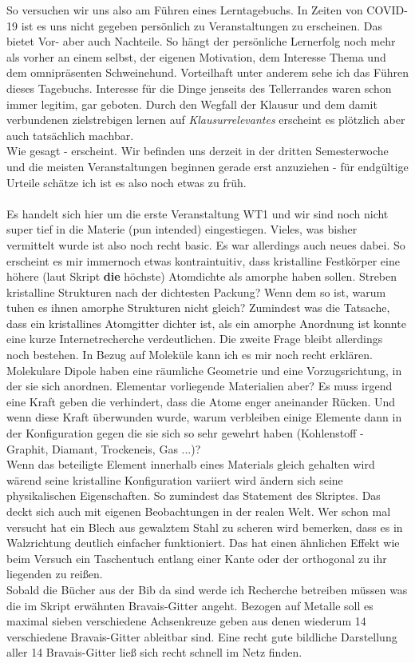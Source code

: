 So versuchen wir uns also am Führen eines Lerntagebuchs. In Zeiten von COVID-19 ist es uns nicht gegeben persönlich zu Veranstaltungen zu erscheinen.
Das bietet Vor- aber auch Nachteile. So hängt der persönliche Lernerfolg noch mehr als vorher an einem selbst, der eigenen Motivation, dem Interesse
Thema und dem omnipräsenten Schweinehund. Vorteilhaft unter anderem sehe ich das Führen dieses Tagebuchs. Interesse für die Dinge jenseits des
Tellerrandes waren schon immer legitim, gar geboten. Durch den Wegfall der Klausur und dem damit verbundenen zielstrebigen lernen auf \textit{Klausurrelevantes}
erscheint es plötzlich aber auch tatsächlich machbar.\\
Wie gesagt - erscheint. Wir befinden uns derzeit in der dritten Semesterwoche und die meisten Veranstaltungen beginnen gerade erst anzuziehen - 
für endgültige Urteile schätze ich ist es also noch etwas zu früh.\\\\
Es handelt sich hier um die erste Veranstaltung WT1 und wir sind noch nicht super tief in die Materie (pun intended) eingestiegen. Vieles, was bisher
vermittelt wurde ist also noch recht basic. Es war allerdings auch neues dabei. So erscheint es mir immernoch etwas kontraintuitiv, dass kristalline Festkörper
eine höhere (laut Skript \textbf{die} höchste) Atomdichte als amorphe haben sollen. Streben kristalline Strukturen nach der dichtesten Packung?
Wenn dem so ist, warum tuhen es ihnen amorphe Strukturen nicht gleich? Zumindest was die Tatsache, dass ein kristallines Atomgitter dichter ist, als ein amorphe
Anordnung ist konnte eine kurze Internetrecherche verdeutlichen. Die zweite Frage bleibt allerdings noch bestehen. In Bezug auf Moleküle kann ich es mir noch recht
erklären. Molekulare Dipole haben eine räumliche Geometrie und eine Vorzugsrichtung, in der sie sich anordnen. Elementar vorliegende Materialien aber?
Es muss irgend eine Kraft geben die verhindert, dass die Atome enger aneinander Rücken. Und wenn diese Kraft überwunden wurde, warum verbleiben einige Elemente dann
in der Konfiguration gegen die sie sich so sehr gewehrt haben (Kohlenstoff - Graphit, Diamant, Trockeneis, Gas ...)?\\
Wenn das beteiligte Element innerhalb eines Materials gleich gehalten wird wärend seine kristalline Konfiguration variiert wird ändern sich seine physikalischen Eigenschaften.
So zumindest das Statement des Skriptes. Das deckt sich auch mit eigenen Beobachtungen in der realen Welt. Wer schon mal versucht hat ein Blech aus gewalztem Stahl zu
scheren wird bemerken, dass es in Walzrichtung deutlich einfacher funktioniert. Das hat einen ähnlichen Effekt wie beim Versuch ein Taschentuch entlang einer Kante 
oder der orthogonal zu ihr liegenden zu reißen.\\
Sobald die Bücher aus der Bib da sind werde ich Recherche betreiben müssen was die im Skript erwähnten Bravais-Gitter angeht. Bezogen auf Metalle
soll es maximal sieben verschiedene Achsenkreuze geben aus denen wiederum 14 verschiedene Bravais-Gitter ableitbar sind. Eine recht gute bildliche Darstellung
aller 14 Bravais-Gitter ließ sich recht schnell im Netz finden.

